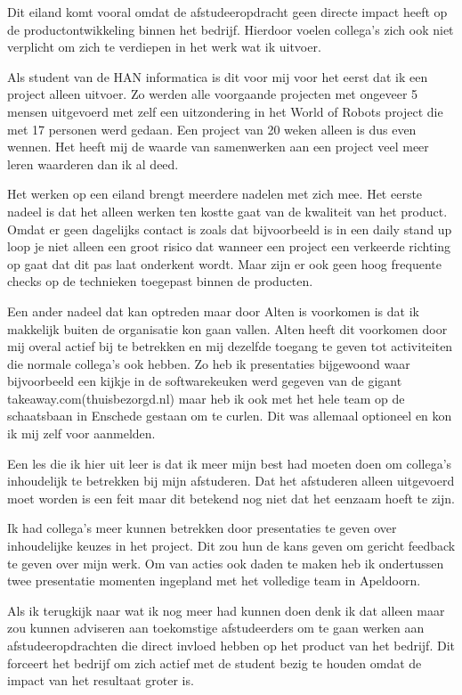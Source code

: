 \documentclass[a4paper, 11pt, oneside]{report}
\begin{document}
Dit eiland komt vooral omdat de afstudeeropdracht geen directe impact heeft op de productontwikkeling binnen het bedrijf. Hierdoor voelen collega's zich ook niet verplicht om zich te verdiepen in het werk wat ik uitvoer. 

Als student van de HAN informatica is dit voor mij voor het eerst dat ik een project alleen uitvoer. 
Zo werden alle voorgaande projecten met ongeveer 5 mensen uitgevoerd met zelf een uitzondering in het World of Robots project die met 17 personen werd gedaan.
Een project van 20 weken alleen is dus even wennen.
Het heeft mij de waarde van samenwerken aan een project veel meer leren waarderen dan ik al deed. 

Het werken op een eiland brengt meerdere nadelen met zich mee.
Het eerste nadeel is dat het alleen werken ten kostte gaat van de kwaliteit van het product.
Omdat er geen dagelijks contact is zoals dat bijvoorbeeld is in een daily stand up loop je niet alleen een groot risico dat wanneer een project een verkeerde richting op gaat dat dit pas laat onderkent wordt. Maar zijn er ook geen hoog frequente checks op de technieken toegepast binnen de producten.

Een ander nadeel dat kan optreden maar door Alten is voorkomen is dat ik makkelijk buiten de organisatie kon gaan vallen.
Alten heeft dit voorkomen door mij overal actief bij te betrekken en mij dezelfde toegang te geven tot activiteiten die normale collega's ook hebben. Zo heb ik presentaties bijgewoond waar bijvoorbeeld een kijkje in de softwarekeuken werd gegeven van de gigant takeaway.com(thuisbezorgd.nl) maar heb ik ook met het hele team op de schaatsbaan in Enschede gestaan om te curlen. Dit was allemaal optioneel en kon ik mij zelf voor aanmelden.

Een les die ik hier uit leer is dat ik meer mijn best had moeten doen om collega's inhoudelijk te betrekken bij mijn afstuderen. Dat het afstuderen alleen uitgevoerd moet worden is een feit maar dit betekend nog niet dat het eenzaam hoeft te zijn.

Ik had collega's meer kunnen betrekken door presentaties te geven over inhoudelijke keuzes in het project. Dit zou hun de kans geven om gericht feedback te geven over mijn werk. Om van acties ook daden te maken heb ik ondertussen twee presentatie momenten ingepland met het volledige team in Apeldoorn.

Als ik terugkijk naar wat ik nog meer had kunnen doen denk ik dat alleen maar zou kunnen adviseren aan toekomstige afstudeerders om te gaan werken aan afstudeeropdrachten die direct invloed hebben op het product van het bedrijf. Dit forceert het bedrijf om zich actief met de student bezig te houden omdat de impact van het resultaat groter is. 
\end{document}
